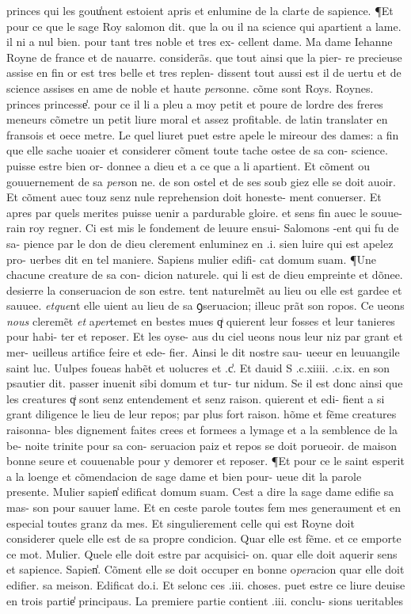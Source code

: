 \documentclass{article}
\begin{document}
\begin{pages}
princes qui les gouu̾nent estoient apris et enlumine de la clarte de sapience. ¶Et pour ce que le sage Roy salomon dit. que la ou il na science qui apartient a lame. il ni a nul bien. pour tant tres noble et tres ex- cellent dame. Ma dame Iehanne Royne de france et de nauarre. considerãs. que tout ainsi que la pier- re precieuse assise en fin or est tres belle et tres replen- dissent tout aussi est il de uertu et de science assises en ame de noble et haute \textit{per}sonne. cõme sont Roys. Roynes. princes princesse̾. pour ce il li a pleu a moy petit et poure de lordre des freres meneurs cõmetre un petit liure moral et assez profitable. de latin translater en fransois et oece metre. Le quel liuret puet estre apele le mireour des dames: a fin que elle sache uoaier et considerer cõment toute tache ostee de sa con- science. puisse estre bien or- donnee a dieu et a ce que a li apartient. Et cõment ou gouuernement de sa \textit{per}son ne. de son ostel et de ses soub giez elle se doit auoir. Et cõment auec touz senz nule reprehension doit honeste- ment conuerser. Et apres par quels merites puisse uenir a pardurable gloire. et sens fin auec le souue- rain roy regner. Ci est mis le fondement de leuure ensui- Salomons -ent qui fu de sa- pience par le don de dieu clerement enluminez en .i. sien luire qui est apelez pro- uerbes dit en tel maniere. Sapiens mulier edifi- cat domum suam. ¶Une chacune creature de sa con- dicion naturele. qui li est de dieu empreinte et dõnee. desierre la conseruacion de son estre. tent naturelmẽt au lieu ou elle est gardee et sauuee. \textit{et}\textit{que}nt elle uient au lieu de sa ꝯseruacion; illeuc prãt son ropos. Ce ueons \textit{nous} cleremẽt \textit{et} a\textit{per}temet en bestes mues qͥ quierent leur fosses et leur tanieres pour habi- ter et reposer. Et les oyse- aus du ciel ueons nous leur niz par grant et mer- ueilleus artifice feire et ede- fier. Ainsi le dit nostre sau- ueeur en leuuangile saint luc. Uulpes foueas habẽt et uolucres et .c̾. Et dauid S .c.xiiii. .c.ix. en son psautier dit. passer inuenit sibi domum et tur- tur nidum. Se il est donc ainsi que les creatures qͥ sont senz entendement et senz raison. quierent et edi- fient a si grant diligence le lieu de leur repos; par plus fort raison. hõme et fẽme creatures raisonna- bles dignement faites crees et formees a lymage et a la semblence de la be- noite trinite pour sa con- seruacion paiz et repos se doit porueoir. de maison bonne seure et couuenable pour y demorer et reposer. ¶Et pour ce le saint esperit a la loenge et cõmendacion de sage dame et bien pour- ueue dit la parole presente. Mulier sapien̾ edificat domum suam. Cest a dire la sage dame edifie sa mas- son pour sauuer lame. Et en ceste parole toutes fem mes generaument et en especial toutes granz da mes. Et singulierement celle qui est Royne doit considerer quele elle est de sa propre condicion. Quar elle est fẽme. et ce emporte ce mot. Mulier. Quele elle doit estre par acquisici- on. quar elle doit aquerir sens et sapience. Sapien̾. Cõment elle se doit occuper en bonne o\textit{per}acion quar elle doit edifier. sa meison. Edificat do.i. Et selonc ces .iii. choses. puet estre ce liure deuise en trois partie̾ principaus. La premiere partie contient .iii. conclu- sions ueritables 
\end{pages}
\end{document}

